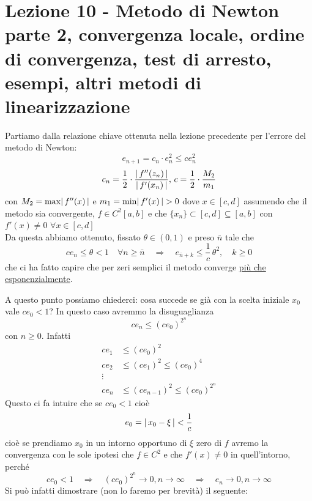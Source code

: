 \documentclass[12pt]{article}
\DeclarePairedDelimiter{\abs}{\lvert}{\rvert}
\begin{document}
\section[Lezione 10 - Ordine di convergenza]{Lezione 10 - Metodo di Newton parte 2, convergenza locale, ordine di convergenza, test di arresto, esempi, altri metodi di linearizzazione}
Partiamo dalla relazione chiave ottenuta nella lezione precedente per l'errore del metodo di Newton:
\[ e_{n+1} = c_n \cdot e_n^2 \leq c e_n^2 \]
\[ c_n = \frac{1}{2} \cdot \frac{\abs{\,f''(z_n)\,}}{\abs{\,f'(x_n)\,}}, \, c = \frac{1}{2} \cdot \frac{M_2}{m_1} \]
con $M_2 = \max\abs{\,f''(x)\,}$ e $m_1 = \min\abs{\,f'(x)\,}>0$ dove $x\in[c,d]$ assumendo che il metodo sia convergente, $f\in C^2[a,b]$ e che $\{ x_n\} \subset{[c,d]} \subseteq{[a,b]}$ con $f'(x)\neq0$ $\forall x\in[c,d]$ \\ 
Da questa abbiamo ottenuto, fissato $\theta\in (0,1)$ e preso $\bar{n}$ tale che 
\[ce_n\leq\theta<1 \quad \forall n\geq\bar{n} \quad \Longrightarrow \quad e_{\bar{n}+k}\leq\frac{1}{c}\,\theta^2, \quad k\geq0\] 
che ci ha fatto capire che per zeri semplici il metodo converge \uline{più che esponenzialmente}.

A questo punto possiamo chiederci: cosa succede se già con la scelta iniziale $x_0$ vale $ce_0<1$? In questo caso avremmo la disuguaglianza \[ ce_n\leq(ce_0)^{2^n} \]
con $n\geq0$. Infatti
\[\begin{split}
    ce_1 & \le (ce_0)^2 \\
    ce_2 & \le (ce_1)^2 \le (ce_0)^4 \\
    \vdots & \\
    ce_n & \le (ce_{n-1})^2 \le (ce_0)^{2^n}
\end{split}\]
Questo ci fa intuire che se $ce_0<1$ cioè 
\[e_0=\abs{\,x_0-\xi\,}<\frac{1}{c}\] 
cioè se prendiamo $x_0$ in un intorno opportuno di $\xi$ zero di $f$ avremo la convergenza con le sole ipotesi che $f \in C^2$ e che $f'(x) \neq 0$ in quell'intorno, perché 
\[ ce_0<1 \quad \Rightarrow \quad (ce_0)^{2^n} \to 0, n\to \infty \quad \Rightarrow \quad e_n \to 0, n \to \infty \]
Si può infatti dimostrare (non lo faremo per brevità) il seguente:
\end{document}
